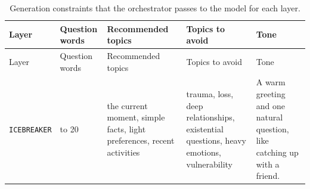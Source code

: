 \documentclass[11pt]{article}
\begin{document}
\begin{longtable}[]{@{}
  >{\raggedright\arraybackslash}p{}
  >{\raggedright\arraybackslash}p{}
  >{\raggedright\arraybackslash}p{}
  >{\raggedright\arraybackslash}p{}
  >{\raggedright\arraybackslash}p{}@{}}
\caption{Generation constraints that the orchestrator passes to the
model for each layer.}\tabularnewline
\toprule\noalign{}
\begin{minipage}[b]{\linewidth}\raggedright
Layer
\end{minipage} & \begin{minipage}[b]{\linewidth}\raggedright
Question words
\end{minipage} & \begin{minipage}[b]{\linewidth}\raggedright
Recommended topics
\end{minipage} & \begin{minipage}[b]{\linewidth}\raggedright
Topics to avoid
\end{minipage} & \begin{minipage}[b]{\linewidth}\raggedright
Tone
\end{minipage} \\
\midrule\noalign{}
\endfirsthead
\toprule\noalign{}
\begin{minipage}[b]{\linewidth}\raggedright
Layer
\end{minipage} & \begin{minipage}[b]{\linewidth}\raggedright
Question words
\end{minipage} & \begin{minipage}[b]{\linewidth}\raggedright
Recommended topics
\end{minipage} & \begin{minipage}[b]{\linewidth}\raggedright
Topics to avoid
\end{minipage} & \begin{minipage}[b]{\linewidth}\raggedright
Tone
\end{minipage} \\
\midrule\noalign{}
\endhead
\bottomrule\noalign{}
\endlastfoot
\texttt{ICEBREAKER} & 8 to 20 & the current moment, simple facts, light
preferences, recent activities & trauma, loss, deep relationships,
existential questions, heavy emotions, vulnerability & A warm greeting
and one natural question, like catching up with a friend. \\

\end{longtable}
\end{document}
